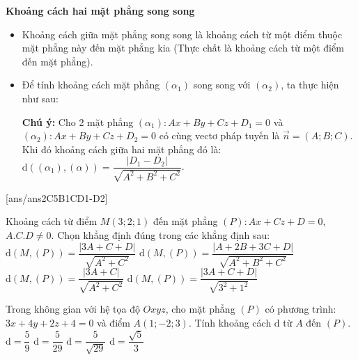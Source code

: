 \textbf{Khoảng cách hai mặt phẳng song song}
\begin{itemize}
\item Khoảng cách giữa mặt phẳng song song là khoảng cách từ một điểm thuộc mặt phẳng này đến mặt phẳng kia (Thực chất là khoảng cách từ một điểm đến mặt phẳng).
\item Để tính khoảng cách mặt phẳng $(\alpha_1)$ song song với $(\alpha_2)$, ta thực hiện như sau:
\textbf{Chú ý:} Cho 2 mặt phẳng $(\alpha_1)\colon Ax+By+Cz+D_1=0$ và $(\alpha_2)\colon Ax+By+Cz+D_2=0$ có cùng vectơ pháp tuyến là $\vec{n}=(A;B;C)$.\\
Khi đó khoảng cách giữa hai mặt phẳng đó là: $\mathrm{d}((\alpha_1),(\alpha))=\dfrac{|D_1-D_2|}{\sqrt{A^2+B^2+C^2}}$.
\end{itemize}
\TN
{}[ans/ans2C5B1CD1-D2]
\begin{ex}%
	Khoảng cách từ điểm $M\left(3;2;1\right)$ đến mặt phẳng $(P)\colon Ax+Cz+D=0$, $A.C.D\ne 0$. Chọn khẳng định đúng trong các khẳng định sau:
\choice
{\True $\mathrm{d}(M,(P))=\dfrac{\left| 3A+C+D\right|}{\sqrt{A^2+C^2}}$}
{$\mathrm{d}(M,(P))=\dfrac{\left| A+2B+3C+D\right|}{\sqrt{A^2+B^2+C^2}}$}
{$\mathrm{d}(M,(P))=\dfrac{\left| 3A+C\right|}{\sqrt{A^2+C^2}}$}
{$\mathrm{d}(M,(P))=\dfrac{\left| 3A+C+D\right|}{\sqrt{3^2+1^2}}$}
\end{ex}

\begin{ex}%
	Trong không gian với hệ tọa độ $Oxyz$, cho mặt phẳng $(P)$ có phương trình: $3x+4y+2z+4=0$ và điểm $A(1;-2;3)$. Tính khoảng cách $\mathrm{d}$ từ $A$ đến $(P)$.
\choice
{$\mathrm{d}=\dfrac{5}{9}$}
{$\mathrm{d}=\dfrac{5}{29}$}
{\True $\mathrm{d}=\dfrac{5}{\sqrt{29}}$}
{$\mathrm{d}=\dfrac{\sqrt{5}}{3}$}
\end{ex}

